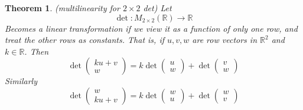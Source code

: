 \documentclass{article}
\newtheorem{theorem}{Theorem}[section]
\newtheorem{one minute paper}[theorem]{One Minute Paper}
\begin{document}
\begin{theorem}
    (multilinearity for $2 \times 2$ det) Let 
    \begin{equation}
        \det: M_{2 \times 2}(\mathbb{R}) \rightarrow \mathbb{R}
    \end{equation}
    Becomes a linear transformation if we view it as a function of only one row, and treat the other rows as constants. That is, if $u,v,w$ are row vectors in $\mathbb{R}^2$ and $k \in \mathbb{R}$. Then 
    \begin{equation}
        \det\begin{pmatrix}
            ku + v \\
            w
        \end{pmatrix} = k\det\begin{pmatrix}
            u \\
            w
        \end{pmatrix} + \det\begin{pmatrix}
            v \\
            w
        \end{pmatrix}
    \end{equation}
    Similarly
    \begin{equation}
        \det\begin{pmatrix}
            w\\
            ku + v
        \end{pmatrix} = k\det\begin{pmatrix}
            w \\
            u
        \end{pmatrix} + \det\begin{pmatrix}
            w \\
            v
        \end{pmatrix}
    \end{equation}
\end{theorem}
\end{document}
